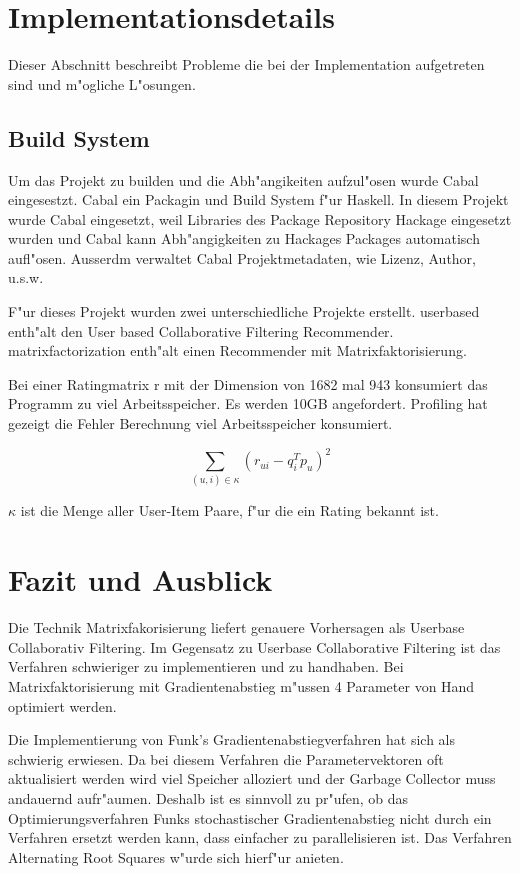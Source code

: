 \documentclass[a4paper, 12pt]{article}
\begin{document}
\section{Implementationsdetails}
\label{sec:ram}

Dieser Abschnitt beschreibt Probleme die bei der Implementation aufgetreten sind und m"ogliche L"osungen.

\subsection{Build System}
\label{sec:cabal}

Um das Projekt zu builden und die Abh"angikeiten aufzul"osen wurde Cabal eingesestzt. Cabal ein Packagin und Build System f"ur Haskell. In diesem Projekt wurde Cabal eingesetzt, weil Libraries des Package Repository Hackage eingesetzt wurden und Cabal kann Abh"angigkeiten zu Hackages Packages automatisch aufl"osen. Ausserdm verwaltet Cabal Projektmetadaten, wie Lizenz, Author, u.s.w.

F"ur dieses Projekt wurden zwei unterschiedliche Projekte erstellt. userbased enth"alt den User based Collaborative Filtering Recommender. matrixfactorization enth"alt einen Recommender mit Matrixfaktorisierung.

Bei einer Ratingmatrix r mit der Dimension von 1682 mal 943 konsumiert das Programm zu viel Arbeitsspeicher. Es werden 10GB angefordert. Profiling hat gezeigt die Fehler Berechnung viel Arbeitsspeicher konsumiert.

\begin{equation}
  \label{eq:squareerror}
  \sum_{(u,i) \in \kappa} (r_{ui} - q_i^T p_u)^2
\end{equation}

$\kappa$ ist die Menge aller User-Item Paare, f"ur die ein Rating bekannt ist.

\section{Fazit und Ausblick}
\label{sec:fazit}

Die Technik Matrixfakorisierung liefert genauere Vorhersagen als Userbase Collaborativ Filtering. Im Gegensatz zu Userbase Collaborative Filtering ist das Verfahren schwieriger zu implementieren und zu handhaben. Bei Matrixfaktorisierung mit Gradientenabstieg m"ussen 4 Parameter von Hand optimiert werden.

Die Implementierung von Funk's Gradientenabstiegverfahren hat sich als schwierig erwiesen. Da bei diesem Verfahren die Parametervektoren oft aktualisiert werden wird viel Speicher alloziert und der Garbage Collector muss andauernd aufr"aumen. Deshalb ist es sinnvoll zu pr"ufen, ob das Optimierungsverfahren Funks stochastischer Gradientenabstieg nicht durch ein Verfahren ersetzt werden kann, dass einfacher zu parallelisieren ist. Das Verfahren Alternating Root Squares w"urde sich hierf"ur anieten.



\end{document}
